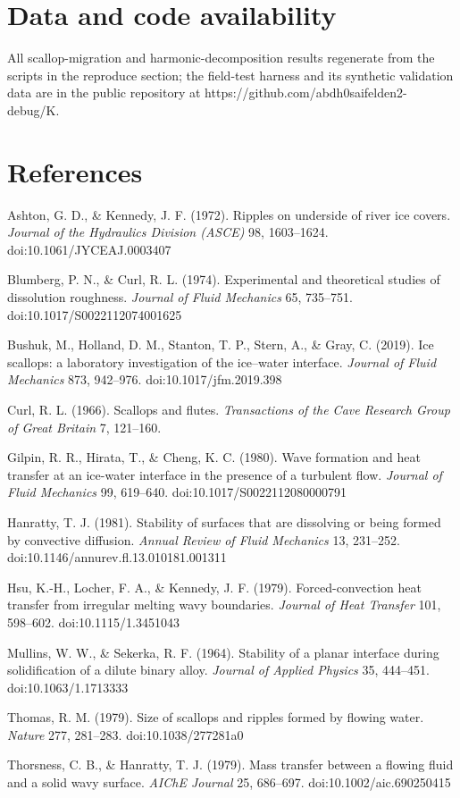 \documentclass[11pt]{article}
\begin{document}
\section*{Data and code availability}


All scallop-migration and harmonic-decomposition results regenerate from the scripts in the reproduce section; the field-test harness and its synthetic validation data are in the public repository at https://github.com/abdh0saifelden2-debug/K.


\section*{References}


Ashton, G. D., \& Kennedy, J. F. (1972). Ripples on underside of river ice covers. \emph{Journal of the Hydraulics Division (ASCE)} 98, 1603–1624. doi:10.1061/JYCEAJ.0003407


Blumberg, P. N., \& Curl, R. L. (1974). Experimental and theoretical studies of dissolution roughness. \emph{Journal of Fluid Mechanics} 65, 735–751. doi:10.1017/S0022112074001625


Bushuk, M., Holland, D. M., Stanton, T. P., Stern, A., \& Gray, C. (2019). Ice scallops: a laboratory investigation of the ice–water interface. \emph{Journal of Fluid Mechanics} 873, 942–976. doi:10.1017/jfm.2019.398


Curl, R. L. (1966). Scallops and flutes. \emph{Transactions of the Cave Research Group of Great Britain} 7, 121–160.


Gilpin, R. R., Hirata, T., \& Cheng, K. C. (1980). Wave formation and heat transfer at an ice-water interface in the presence of a turbulent flow. \emph{Journal of Fluid Mechanics} 99, 619–640. doi:10.1017/S0022112080000791


Hanratty, T. J. (1981). Stability of surfaces that are dissolving or being formed by convective diffusion. \emph{Annual Review of Fluid Mechanics} 13, 231–252. doi:10.1146/annurev.fl.13.010181.001311


Hsu, K.-H., Locher, F. A., \& Kennedy, J. F. (1979). Forced-convection heat transfer from irregular melting wavy boundaries. \emph{Journal of Heat Transfer} 101, 598–602. doi:10.1115/1.3451043


Mullins, W. W., \& Sekerka, R. F. (1964). Stability of a planar interface during solidification of a dilute binary alloy. \emph{Journal of Applied Physics} 35, 444–451. doi:10.1063/1.1713333


Thomas, R. M. (1979). Size of scallops and ripples formed by flowing water. \emph{Nature} 277, 281–283. doi:10.1038/277281a0


Thorsness, C. B., \& Hanratty, T. J. (1979). Mass transfer between a flowing fluid and a solid wavy surface. \emph{AIChE Journal} 25, 686–697. doi:10.1002/aic.690250415
\end{document}
